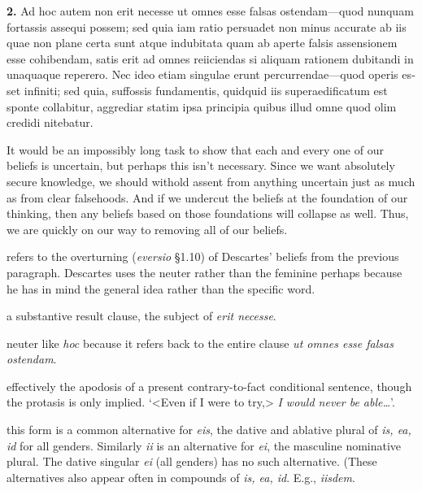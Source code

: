 
\clearpage

\beginnumbering
\pstart
\begin{latin}
    \textenglish{\textbf{2.}} Ad hoc autem non erit necesse ut omnes esse falsas ostendam---quod nunquam fortassis assequi possem; sed quia iam ratio persuadet non minus accurate ab iis quae non plane certa sunt atque indubitata quam ab aperte falsis assensionem esse cohibendam, satis erit ad omnes reiiciendas si aliquam rationem dubitandi in unaquaque reperero. Nec ideo etiam singulae erunt percurrendae---quod operis esset infiniti; sed quia, suffossis fundamentis, quidquid iis superaedificatum est sponte collabitur, aggrediar statim ipsa principia quibus illud omne quod olim credidi nitebatur.
\end{latin}
\pend
\endnumbering

\prenotes

It would be an impossibly long task to show that each and every one of our beliefs is uncertain, but perhaps this isn't necessary. Since we want absolutely secure knowledge, we should withold assent from anything uncertain just as much as from clear falsehoods. And if we undercut the beliefs at the foundation of our thinking, then any beliefs based on those foundations will collapse as well. Thus, we are quickly on our way to removing all of our beliefs.

 refers to the overturning (\textit{eversio} §1.10) of Descartes' beliefs from the previous paragraph. Descartes uses the neuter rather than the feminine perhaps because he has in mind the general idea rather than the specific word.

 a substantive result clause, the subject of \textit{erit necesse}.

 neuter like \textit{hoc} because it refers back to the entire clause \textit{ut omnes esse falsas ostendam}.

 effectively the apodosis of a present contrary-to-fact conditional sentence, though the protasis is only implied. `<Even if I were to try,> \textit{I would never be able\dots}'.

 this form is a common alternative for \textit{eis}, the dative and ablative plural of \textit{is, ea, id} for all genders. Similarly \textit{ii} is an alternative for \textit{ei}, the masculine nominative plural. The dative singular \textit{ei} (all genders) has no such alternative. (These alternatives also appear often in compounds of \textit{is, ea, id}. E.g., \textit{iisdem}.

